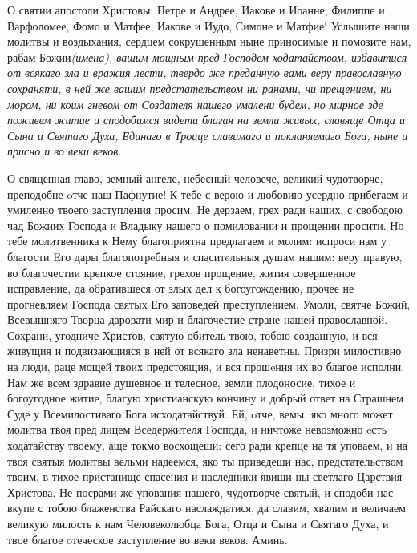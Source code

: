 

\label{_content_molitvi-svyatim}

 

 



 О святии апостоли Христовы: Петре и  Андрее, Иакове и Иоанне, Филиппе и Варфоломее, Фомо и Матфее, Иакове и Иудо, Симоне и Матфие! Услышите наши молитвы и воздыхания, сердцем сокрушенным  ныне приносимые и помозите нам, рабам Божии\itshape  (имена\normalfont{}), вашим мощным пред Господем ходатайством, избавитися от всякаго зла и вражия лести, твердо же преданную вами веру православную сохраняти, в ней же вашим предстательством ни ранами, ни прещением, ни мором, ни коим гневом  от Создателя нашего умалени будем, но мирное зде поживем житие и сподобимся видети благая на земли живых, славяще Отца и Сына и Святаго Духа, Единаго в Троице славимаго и покланяемаго Бога, ныне и присно и во веки веков.
\mychapterending

 



О священная главо, земный ангеле, небесный человече, великий чудотворче, преподобне oтче наш Пафнутие! К тебе с верою и любовию усердно прибегаем и умиленно твоего заступления просим. Не дерзаем, грех ради наших, с свободою чад Божиих Господа и Владыку нашего о помиловании и прощении просити. Но тебе молитвенника к Нему благоприятна предлагаем и молим: испроси нам у благости Eго дары благопотрeбныя и спаситeльныя душам нашим: веру правую, во благочестии крепкое стояние, грехов прощение, жития совершенное исправление, да обратившеся от злых дел к богоугождению, прочее не прогневляем Господа святых Его заповедей преступлением. Умоли, святче Божий, Всевышняго Творца даровати мир и благочестие стране нашей православной. Сохрани, угодниче Христов, святую обитель твою, тобою созданную, и вся живущия и подвизающияся в ней от всякаго зла ненаветны. Призри милостивно на люди, раце мощей твоих предстоящия, и вся прошeния их во благое исполни. Нам же всем здравие душевное и телесное, земли плодоносие, тихое и богоугодное житие, благую христианскую кончину и добрый ответ на Страшнем Суде у Всемилостиваго Бога исходатайствуй. Ей, oтче, вемы, яко много может молитва твоя пред лицем Вседержителя Господа, и ничтоже невозможно eсть ходатайству твоему, аще токмо восхощеши: сего ради крепце на тя уповаем, и на твоя святыя молитвы вельми надеемся, яко ты приведеши нас, предстательством твоим, в тихое пристанище спасения и наследники явиши ны светлаго Царствия Христова. Не посрами же упования нашего, чудотворче святый, и сподоби нас вкупе с тобою блаженства Райскаго наслаждатися, да славим, хвалим и величаем великую милость к нам Человеколюбца Бога, Отца и Сына и Святаго Духа, и твое благое oтеческое заступление во веки веков. Аминь.
\mychapterending

